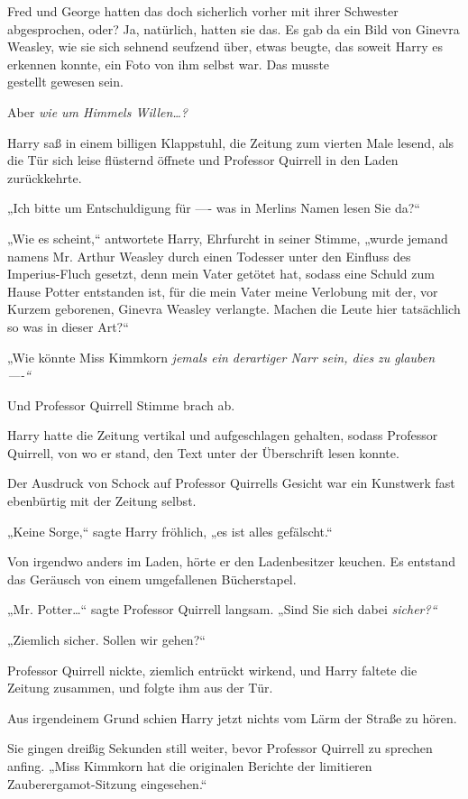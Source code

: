 {Fred und George hatten das doch sicherlich vorher mit ihrer Schwester abgesprochen, oder? Ja, natürlich, hatten sie das. Es gab da ein Bild von Ginevra Weasley, wie sie sich sehnend seufzend über, etwas beugte, das soweit Harry es erkennen konnte, ein Foto von ihm selbst war. Das musste\\ gestellt gewesen sein.

Aber \emph{wie um Himmels Willen…?}

Harry saß in einem billigen Klappstuhl, die Zeitung zum vierten Male lesend, als die Tür sich leise flüsternd öffnete und Professor Quirrell in den Laden zurückkehrte.

„Ich bitte um Entschuldigung für ---- was in Merlins Namen lesen Sie da?“

„Wie es scheint,“ antwortete Harry, Ehrfurcht in seiner Stimme, „wurde jemand namens Mr. Arthur Weasley durch einen Todesser unter den Einfluss des Imperius-Fluch gesetzt, denn mein Vater getötet hat, sodass eine Schuld zum Hause Potter entstanden ist, für die mein Vater meine Verlobung mit der, vor Kurzem geborenen, Ginevra Weasley verlangte. Machen die Leute hier tatsächlich so was in dieser Art?“

„Wie könnte Miss Kimmkorn \emph{jemals ein derartiger Narr sein, dies zu glauben ----“}

Und Professor Quirrell Stimme brach ab.

Harry hatte die Zeitung vertikal und aufgeschlagen gehalten, sodass Professor Quirrell, von wo er stand, den Text unter der Überschrift lesen konnte.

Der Ausdruck von Schock auf Professor Quirrells Gesicht war ein Kunstwerk fast ebenbürtig mit der Zeitung selbst.

„Keine Sorge,“ sagte Harry fröhlich, „es ist alles gefälscht.“

Von irgendwo anders im Laden, hörte er den Ladenbesitzer keuchen. Es entstand das Geräusch von einem umgefallenen Bücherstapel.

„Mr. Potter…“ sagte Professor Quirrell langsam. „Sind Sie sich dabei \emph{sicher?“}

„Ziemlich sicher. Sollen wir gehen?“

Professor Quirrell nickte, ziemlich entrückt wirkend, und Harry faltete die Zeitung zusammen, und folgte ihm aus der Tür.

Aus irgendeinem Grund schien Harry jetzt nichts vom Lärm der Straße zu hören.

Sie gingen dreißig Sekunden still weiter, bevor Professor Quirrell zu sprechen anfing. „Miss Kimmkorn hat die originalen Berichte der limitieren Zauberergamot-Sitzung eingesehen.“

}
